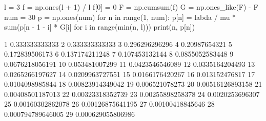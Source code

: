 
l = 3
f = np.ones(l + 1) / l
f[0] = 0
F = np.cumsum(f)
G = np.ones_like(F) - F
num = 30
p = np.ones(num)
for n in range(1, num):
    p[n] = labda / mu * sum(p[n - 1 - i] * G[i] for i in range(min(n, l)))
    print(n, p[n])

1 0.333333333333
2 0.333333333333
3 0.296296296296
4 0.20987654321
5 0.172839506173
6 0.137174211248
7 0.107453132144
8 0.0855052583448
9 0.0676218056191
10 0.053481007299
11 0.0423546546089
12 0.0335164204493
13 0.0265266197627
14 0.0209963727551
15 0.0166176420267
16 0.013152476817
17 0.0104098985844
18 0.00823914349042
19 0.006521078273
20 0.00516126893158
21 0.00408501187013
22 0.00323318352739
23 0.00255898258378
24 0.0020253696307
25 0.00160302862078
26 0.00126875641195
27 0.00100418845646
28 0.000794789646005
29 0.000629055806986
